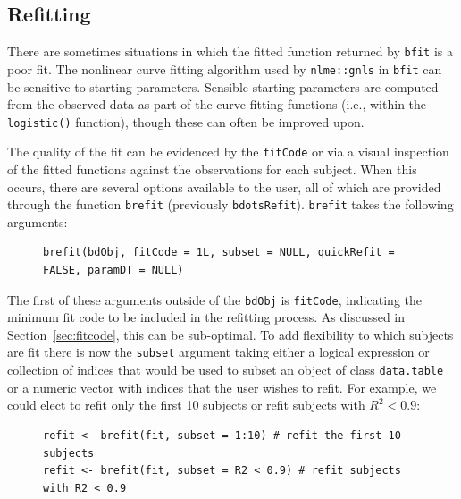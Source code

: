 \documentclass{article}
\newcommand{\xt}{\texttt}%
\begin{document}
\subsection{Refitting}

There are sometimes situations in which the fitted function returned by \texttt{bfit} is a poor fit. The nonlinear curve fitting algorithm used by \xt{nlme::gnls} in \xt{bfit} can be sensitive to starting parameters. Sensible starting parameters are computed from the observed data as part of the curve fitting functions (i.e., within the \xt{logistic()} function), though these can often be improved upon.


The quality of the fit can be evidenced by the \texttt{fitCode} or via a visual inspection of the fitted functions against the observations for each subject.  When this occurs, there are several options available to the user, all of which are provided through the function \texttt{brefit} (previously \texttt{bdotsRefit}). \texttt{brefit} takes the following arguments:

\begin{singlespace}
\begin{figure}[H]
\centering
\begin{BVerbatim}
brefit(bdObj, fitCode = 1L, subset = NULL, quickRefit = FALSE, paramDT = NULL)
\end{BVerbatim}
\end{figure}
\end{singlespace}

The first of these arguments outside of the \xt{bdObj} is \xt{fitCode}, indicating the minimum fit code to be included in the refitting process. As discussed in Section~\ref{sec:fitcode}, this can be sub-optimal. To add flexibility to which subjects are fit there is now the \xt{subset} argument taking either a logical expression or collection of indices that would be used to subset an object of class \xt{data.table} or a numeric vector with indices that the user wishes to refit. For example, we could elect to refit only the first 10 subjects or refit subjects with $R^2 < 0.9$:

\begin{singlespace}
\begin{figure}[H]
\centering
\begin{BVerbatim}
refit <- brefit(fit, subset = 1:10) # refit the first 10 subjects
refit <- brefit(fit, subset = R2 < 0.9) # refit subjects with R2 < 0.9
\end{BVerbatim}
\end{figure}
\end{singlespace}
\end{document}
